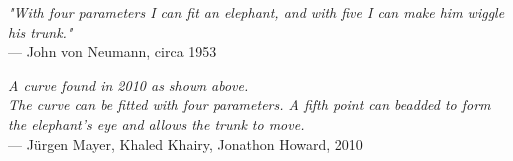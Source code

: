 \begin{flushright}
\emph{"With four parameters I can fit an elephant, and with five I can make him wiggle his trunk."}\\
— John von Neumann, circa 1953
\end{flushright}

\vspace{0.5em}


\vspace{0.5em}

\begin{flushright}
\emph{A curve found in 2010 as shown above.}\\
\emph{The curve can be fitted with four parameters. A fifth point can beadded to form the elephant's eye and allows the trunk to move.}
\\
— Jürgen Mayer, Khaled Khairy, Jonathon Howard, 2010
\end{flushright}
